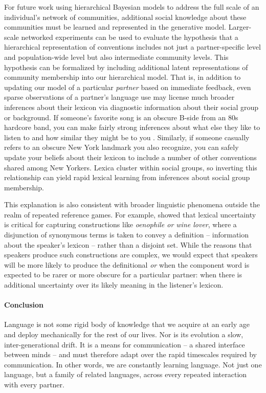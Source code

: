 For future work using hierarchical Bayesian models to address the full scale of an individual's  network of communities, additional social knowledge about these communities must be learned and represented in the generative model.
Larger-scale networked experiments can be used to evaluate the hypothesis that a hierarchical representation of conventions includes not just a partner-specific level and population-wide level but also intermediate community levels. 
This hypothesis can be formalized by including additional latent representations of community membership into our hierarchical model.
That is, in addition to updating our model of a particular \emph{partner} based on immediate feedback, even sparse observations of a partner's language use may license much broader inferences about their lexicon via diagnostic information about their social group or background. 
If someone's favorite song is an obscure B-side from an 80s hardcore band, you can make fairly strong inferences about what else they like to listen to and how similar they might be to you \cite{VelezEtAl16_Overlaps, GershmanEtAl17_StructureSocialInfluence}. 
Similarly, if someone casually refers to an obscure New York landmark you also recognize, you can safely update your beliefs about their lexicon to include a number of other conventions shared among New Yorkers. 
Lexica cluster within social groups, so inverting this relationship can yield rapid lexical learning from inferences about social group membership.

This explanation is also consistent with broader linguistic phenomena outside the realm of repeated reference games. 
For example,  showed that lexical uncertainty is critical for capturing constructions like \emph{oenophile or wine lover}, where a disjunction of synonymous terms is taken to convey a definition -- information about the speaker's lexicon -- rather than a disjoint set. 
While the reasons that speakers produce such constructions are complex, we would expect that speakers will be more likely to produce the definitional \emph{or} when the component word is expected to be rarer or more obscure for a particular partner: when there is additional uncertainty over its likely meaning in the listener's lexicon.

\paragraph{Conclusion}

Language is not some rigid body of knowledge that we acquire at an early age and deploy mechanically for the rest of our lives. 
Nor is its evolution a slow, inter-generational drift. 
It is a means for communication -- a shared interface between minds -- and must therefore adapt over the rapid timescales required by communication. 
In other words, we are constantly learning language. 
Not just one language, but a family of related languages, across every repeated interaction with every partner. 

